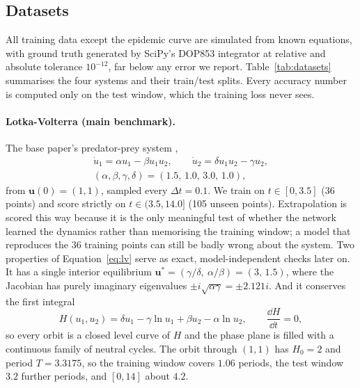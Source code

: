 \subsection{Datasets}
\label{sec:datasets}

All training data except the epidemic curve are simulated from known
equations, with ground truth generated by SciPy's \cite{virtanen2020scipy}
DOP853 integrator at relative and absolute tolerance $10^{-12}$, far below
any error we report. Table~\ref{tab:datasets} summarises the four systems
and their train/test splits. Every accuracy number is computed only on the
test window, which the training loss never sees.

\paragraph{Lotka-Volterra (main benchmark).} The base paper's predator-prey
system \cite{Koenig_2024},
\begin{gather}
\dot u_1 = \alpha u_1 - \beta u_1 u_2, \qquad \dot u_2 = \delta u_1 u_2 - \gamma u_2,
\nonumber\\
(\alpha,\beta,\gamma,\delta) = (1.5,\,1.0,\,3.0,\,1.0),
\label{eq:lv}
\end{gather}
from $\mathbf{u}(0)=(1,1)$, sampled every $\Delta t=0.1$. We train on
$t\in[0,3.5]$ (36 points) and score strictly on $t\in(3.5,14.0]$ (105
unseen points). Extrapolation is scored this way because it is the only
meaningful test of whether the network learned the dynamics rather than
memorising the training window; a model that reproduces the 36 training
points can still be badly wrong about the system. Two properties of
Equation~\ref{eq:lv} serve as exact, model-independent checks later on. It
has a single interior equilibrium
$\mathbf{u}^\ast=(\gamma/\delta,\ \alpha/\beta)=(3,\,1.5)$, where the
Jacobian has purely imaginary eigenvalues $\pm i\sqrt{\alpha\gamma}=\pm2.121i$.
And it conserves the first integral
\begin{equation}
H(u_1,u_2)=\delta u_1-\gamma\ln u_1+\beta u_2-\alpha\ln u_2,
\qquad \frac{\dd H}{\dd t}=0,
\label{eq:lv-invariant}
\end{equation}
so every orbit is a closed level curve of $H$ and the phase plane is filled
with a continuous family of neutral cycles. The orbit through $(1,1)$ has
$H_0=2$ and period $T=3.3175$, so the training window covers $1.06$
periods, the test window $3.2$ further periods, and $[0,14]$ about $4.2$.

